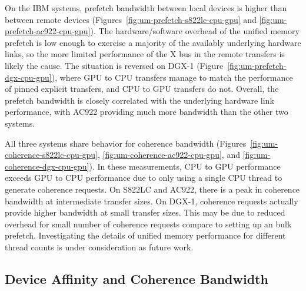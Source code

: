 On the IBM systems, prefetch bandwidth between local devices is higher than between remote devices (Figures~\ref{fig:um-prefetch-s822lc-cpu-gpu} and \ref{fig:um-prefetch-ac922-cpu-gpu}).
The hardware/software overhead of the unified memory prefetch is low enough to exercise a majority of the availably underlying hardware links, so the more limited performance of the X bus in the remote transfers is likely the cause.
The situation is reversed on DGX-1 (Figure~\ref{fig:um-prefetch-dgx-cpu-gpu}), where GPU to CPU transfers manage to match the performance of pinned explicit transfers, and CPU to GPU transfers do not.
Overall, the prefetch bandwidth is closely correlated with the underlying hardware link performance, with AC922 providing much more bandwidth than the other two systems.

All three systems share behavior for coherence bandwidth (Figures~\ref{fig:um-coherence-s822lc-cpu-gpu}, \ref{fig:um-coherence-ac922-cpu-gpu}, and \ref{fig:um-coherence-dgx-cpu-gpu}).
In these measurements, CPU to GPU performance exceeds GPU to CPU performance due to only using a single CPU thread to generate coherence requests.
On S822LC and AC922, there is a peak in coherence bandwidth at intermediate transfer sizes.
On DGX-1, coherence requests actually provide higher bandwidth at small transfer sizes.
This may be due to reduced overhead for small number of coherence requests compare to setting up an bulk prefetch.
Investigating the details of unified memory performance for different thread counts is under consideration as future work.

\subsection{Device Affinity and Coherence Bandwidth}


